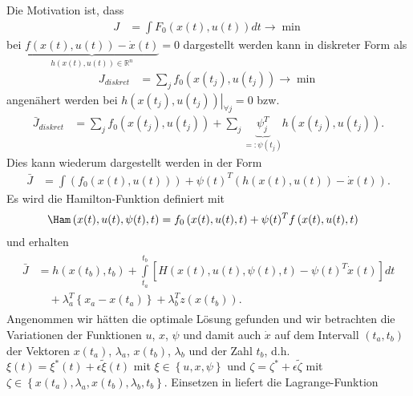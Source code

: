 Die Motivation ist, dass 
\begin{align*}
	J & = \int F_0(x(t),u(t))dt \rightarrow \min
\end{align*}
bei $\underbrace{f\left(x(t), u(t) \right)-\dot{x}(t) }_{h\left(x(t),u(t) \right)\in\mathbb{R}^n }=0$ dargestellt werden kann in diskreter Form als
\begin{align*}
	J_{diskret} & = \sum\limits_j f_0(x(t_j),u(t_j))\rightarrow \min 
\end{align*}
angenähert werden bei $\left. h\left(x(t_j),u(t_j) \right)\right|_{\forall j}=0$ bzw.
\begin{align*}
	\bar{J}_{diskret} & = \sum\limits_j f_0(x(t_j),u(t_j)) + \sum\limits_j \underbrace{\psi_j^T}_{=:\psi(t_j)} h\left(x(t_j),u(t_j) \right).
\end{align*}
Dies kann wiederum dargestellt werden in der Form
\begin{align*}
	\bar{J} & = \int\left(f_0(x(t),u(t)) \right) + \psi(t)^T\left(h(x(t),u(t))-\dot{x}(t) \right).
\end{align*}
Es wird die Hamilton-Funktion definiert mit
\begin{align*}
	\Ham\left(x(t),u(t),\psi(t),t \right) & = f_0\left(x(t),u(t),t \right) + \psi(t)^T f\left(x(t),u(t),t \right)
\end{align*}
und erhalten 
\begin{align}
	\begin{split}\label{eqn:kap_2_lagrange_fun}
		\bar{J} & = h\left(x(t_b),t_b \right) + \int\limits_{t_a}^{t_b}\left[H\left(x(t),u(t),\psi(t),t \right)-\psi(t)^T\dot{x}(t) \right]dt\\
				& \quad +\lambda_a^T\left\{x_a-x(t_a) \right\} + \lambda_b^T z\left(x(t_b)\right).
	\end{split}
\end{align}
Angenommen wir hätten die optimale Lösung gefunden und wir betrachten die Variationen der Funktionen $u$, $x$, $\psi$ und damit auch $\dot{x}$ auf dem
Intervall $\left(t_a, t_b \right)$ der Vektoren $x(t_a)$, $\lambda_a$, $x(t_b)$, $\lambda_b$ und der Zahl $t_b$, d.h.
$\xi(t)=\xi^{\ast}(t)+\epsilon\tilde{\xi}(t)$ mit $\xi\in \left\{u,x,\psi\right\}$ und $\zeta=\zeta^{\ast} + \epsilon \tilde{\zeta}$ mit $\zeta \in \left\{x(t_a),\lambda_a, x(t_b), \lambda_b, t_b\right\}$. Einsetzen in
 liefert die Lagrange-Funktion
